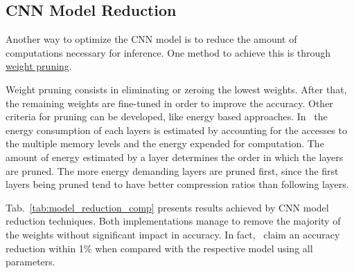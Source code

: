 \subsection{CNN Model Reduction}
\label{sec:CNN_prunning}
Another way to optimize the CNN model is to reduce the amount of computations
necessary for inference. One method to achieve this is through
\underline{weight pruning}. %

Weight pruning consists in eliminating or zeroing the lowest weights. After
that, the remaining weights are fine-tuned in order to improve the
accuracy. Other criteria for pruning can be developed, like energy based
approaches. In~\cite{Yang_Energy-prunning} the energy consumption of each layers is estimated
by accounting for the accesses to the multiple memory levels and the energy expended for computation.
The amount of energy estimated by a layer determines the order in which the layers are pruned.
The more energy demanding layers are pruned first, since the first layers being pruned tend
to have better compression ratios than following layers.


Tab.~\ref{tab:model_reduction_comp} presents results achieved by CNN model
reduction techniques. Both implementations manage to remove the majority of the
weights without significant impact in accuracy. In
fact,~\cite{Hal_model_reduction_ref45,
  Hal_model_reduction_ref7} claim an accuracy reduction within 1\% when compared
with the respective model using all parameters.


